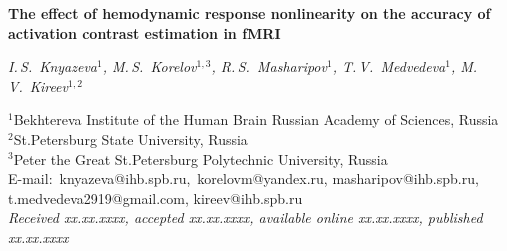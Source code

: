 \documentclass[11pt,twoside,a4paper]{article}
\let\Letter\undefined
\newcommand{\published}{xx.xx.xxxx} 		%
\renewcommand{\received}{xx.xx.xxxx} 		%
\renewcommand{\accepted}{xx.xx.xxxx} 		%
\renewcommand{\onlinepublished}{xx.xx.xxxx} %
\renewcommand{\titpaperen}{The effect of hemodynamic response nonlinearity on the accuracy of activation contrast estimation in fMRI}
\begin{document}
\newpage

\vspace{.5\baselineskip}

\begin{center}\textbf{\large \titpaperen}
	\vspace{1\baselineskip}
	
\emph{I.\,S.~Knyazeva$^{1}$, M.\,S.~Korelov$^{1,3}$, R.\,S.~Masharipov$^{1}$, T.\,V.~Medvedeva$^{1}$, M.\,V.~Kireev$^{1,2}$}\vspace{.7\baselineskip}

\footnotesize{
	$^{1}$Bekhtereva Institute of the Human Brain Russian Academy of Sciences, Russia \\
	$^{2}$St.Petersburg State University, Russia\\
	$^{3}$Peter the Great St.Petersburg Polytechnic University, Russia\\
	E-mail: \Letter\,knyazeva@ihb.spb.ru, \Letter\,korelovm@yandex.ru, masharipov@ihb.spb.ru, t.medvedeva2919@gmail.com, kireev@ihb.spb.ru\\[1pt]
	\emph{Received  \received, accepted \accepted, available online \onlinepublished, published \published}	
		
	}
\end{center}\vspace{.5\baselineskip}
\end{document}
